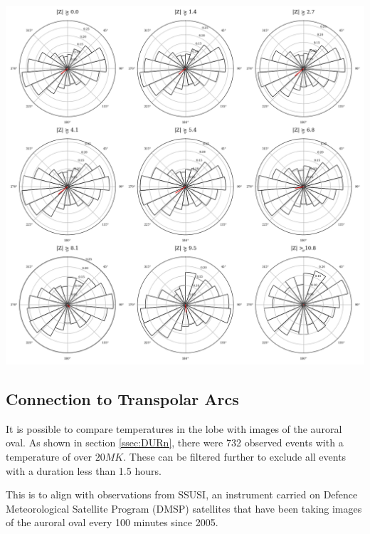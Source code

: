 \documentclass[12pt]{article}
\newenvironment{Figure}
  {\par\medskip\noindent\minipage{\linewidth}}
  {\endminipage\par\medskip}
\begin{document}
\begin{Figure}
    \centering
    \includegraphics[width=\textwidth]{imf_angle_hist.png}
    \label{fig:imf_angle_hist}
\end{Figure}

\subsection{Connection to Transpolar Arcs}
It is possible to compare temperatures in the lobe with images of the auroral oval. As shown in section \ref{ssec:DURn}, there were 732 observed events with a temperature of over $20MK$. These can be filtered further to exclude all events with a duration less than 1.5 hours. 

This is to align with observations from SSUSI, an instrument carried on Defence Meteorological Satellite Program (DMSP) satellites that have been taking images of the auroral oval every 100 minutes since 2005. 
\end{document}
